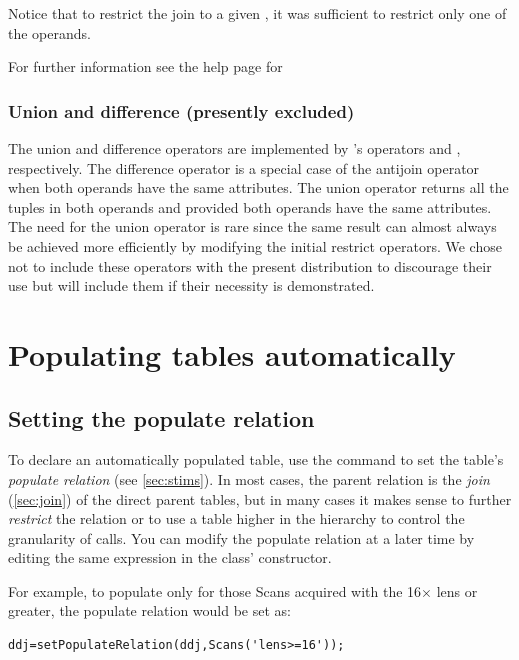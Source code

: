 \documentclass[10pt]{article}
\begin{document}
Notice that to restrict the join to a given , it was sufficient to restrict only one of the operands.

For further information see the help page for 

\subsubsection{Union and difference (presently excluded)}
The union and difference operators are implemented by 's operators \mcode{+} and \mcode{-}, respectively.  The difference operator  is a special case of the antijoin operator  when both operands have the same attributes.  The union operator  returns all the tuples in both operands  and  provided both operands have the same attributes. The need for the union operator is rare since the same result can almost always be achieved more efficiently by modifying the initial restrict operators. We chose not to include these operators with the present distribution to discourage their use but will include them if their necessity is demonstrated.

\newpage\section{Populating tables automatically}
\subsection{Setting the populate relation}
To declare an automatically populated table, use the  command to set the table's {\em populate relation} (see \autoref{sec:stims}). In most cases, the parent relation is the {\em join} (\autoref{sec:join}) of the direct parent tables, but in many cases it makes sense to further {\em restrict} the relation or to use a table higher in the hierarchy to control the granularity of  calls.   You can modify the populate relation at a later time by editing the same expression in the class' constructor.

For example, to populate  only for those Scans acquired with the 16$\times$ lens or greater, the populate relation would be set as:
\begin{lstlisting}
ddj=setPopulateRelation(ddj,Scans('lens>=16'));
\end{lstlisting}
\end{document}
